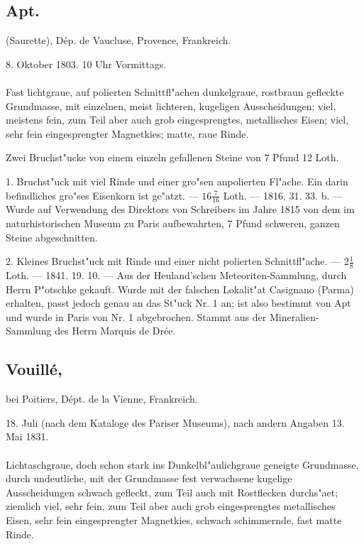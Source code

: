 \documentclass[a4paper, 11pt, oneside, polutonikogreek, german]{article}
\begin{document}
\subsection{Apt.}
\begin{center}
\small
(Saurette), Dép. de Vaucluse, Provence, Frankreich.

8. Oktober 1803. 10 Uhr Vormittags.
\end{center}
\paragraph{}
Fast lichtgraue, auf polierten Schnittfl"achen dunkelgraue, rostbraun gefleckte Grundmasse, mit einzelnen, meist lichteren, kugeligen Ausscheidungen; viel, meistens fein, zum Teil aber auch grob eingesprengtes, metallisches Eisen; viel, sehr fein eingesprengter Magnetkies; matte, raue Rinde.

Zwei Bruchst"ucke von einem einzeln gefallenen Steine von 7 Pfund 12 Loth.

1. Bruchst"uck mit viel Rinde und einer gro"sen anpolierten Fl"ache. Ein darin befindliches gro"ses Eisenkorn ist ge"atzt. --- $16\frac{7}{16}$ Loth. --- 1816. 31. 33. b. --- Wurde auf Verwendung des Direktors von Schreibers im Jahre 1815 von dem im naturhistorischen Museum zu Paris aufbewahrten, 7 Pfund schweren, ganzen Steine abgeschnitten.

2. Kleines Bruchst"uck mit Rinde und einer nicht polierten Schnittfl"ache. --- $2\frac{1}{8}$ Loth. --- 1841. 19. 10. --- Aus der Heuland'schen Meteoriten-Sammlung, durch Herrn P"otschke gekauft. Wurde mit der falschen Lokalit"at Casignano (Parma) erhalten, passt jedoch genau an das St"uck Nr. 1 an; ist also bestimmt von Apt und wurde in Paris von Nr. 1 abgebrochen. Stammt aus der Mineralien-Sammlung des Herrn Marquis de Drée.
\subsection[Vouillé.]{Vouillé,}
\begin{center}
\small
bei Poitiers, Dépt. de la Vienne, Frankreich.

18. Juli (nach dem Kataloge des Pariser Museums), nach andern Angaben 13. Mai 1831.
\end{center}
\paragraph{}
Lichtaschgraue, doch schon stark ins Dunkelbl"aulichgraue geneigte Grundmasse, durch undeutliche, mit der Grundmasse fest verwachsene kugelige Ausscheidungen schwach gefleckt, zum Teil auch mit Rostflecken durchs"aet; ziemlich viel, sehr fein, zum Teil aber auch grob eingesprengtes metallisches Eisen, sehr fein eingesprengter Magnetkies, schwach schimmernde, fast matte Rinde.
\end{document}

